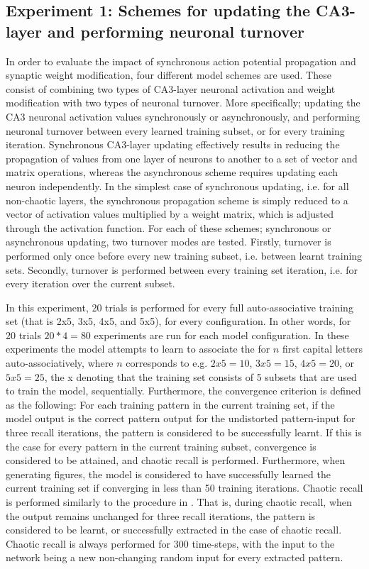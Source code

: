 \subsection{Experiment 1: Schemes for updating the CA3-layer and performing neuronal turnover}

In order to evaluate the impact of synchronous action potential propagation and synaptic weight modification, four different model schemes are used. These consist of combining two types of CA3-layer neuronal activation and weight modification with two types of neuronal turnover. More specifically; updating the CA3 neuronal activation values synchronously or asynchronously, and performing neuronal turnover between every learned training subset, or for every training iteration. Synchronous CA3-layer updating effectively results in reducing the propagation of values from one layer of neurons to another to a set of vector and matrix operations, whereas the asynchronous scheme requires updating each neuron independently. In the simplest case of synchronous updating, i.e. for all non-chaotic layers, the synchronous propagation scheme is simply reduced to a vector of activation values multiplied by a weight matrix, which is adjusted through the activation function. For each of these schemes; synchronous or asynchronous updating, two turnover modes are tested. Firstly, turnover is performed only once before every new training subset, i.e. between learnt training sets. Secondly, turnover is performed between every training set iteration, i.e. for every iteration over the current subset.

In this experiment, 20 trials is performed for every full auto-associative training set (that is 2x5, 3x5, 4x5, and 5x5), for every configuration. In other words, for 20 trials $20 * 4 = 80$ experiments are run for each model configuration. In these experiments the model attempts to learn to associate the for $n$ first capital letters auto-associatively, where $n$ corresponds to e.g. $2x5 = 10$, $3x5=15$, $4x5=20$, or $5x5=25$, the x denoting that the training set consists of 5 subsets that are used to train the model, sequentially. 
Furthermore, the convergence criterion is defined as the following: For each training pattern in the current training set, if the model output is the correct pattern output for the undistorted pattern-input for three recall iterations, the pattern is considered to be successfully learnt. If this is the case for every pattern in the current training subset, convergence is considered to be attained, and chaotic recall is performed. Furthermore, when generating figures, the model is considered to have successfully learned the current training set if converging in less than 50 training iterations. Chaotic recall is performed similarly to the procedure in \citep{Hattori2010, Hattori2014}. That is, during chaotic recall, when the output remains unchanged for three recall iterations, the pattern is considered to be learnt, or successfully extracted in the case of chaotic recall. Chaotic recall is always performed for 300 time-steps, with the input to the network being a new non-changing random input for every extracted pattern.


